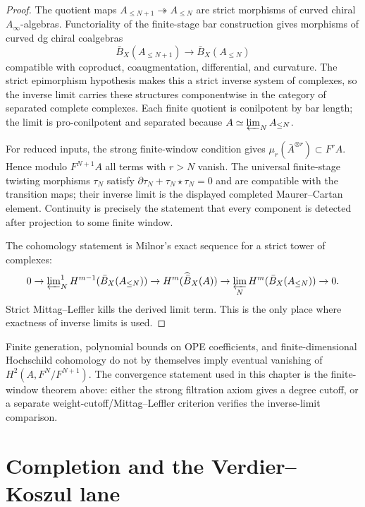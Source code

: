 \begin{proof}
The quotient maps $A_{\le N+1}\twoheadrightarrow A_{\le N}$ are
strict morphisms of curved chiral $A_\infty$-algebras.  Functoriality
of the finite-stage bar construction gives morphisms of curved dg
chiral coalgebras
\[
\bar B_X(A_{\le N+1})\longrightarrow\bar B_X(A_{\le N})
\]
compatible with coproduct, coaugmentation, differential, and curvature.
The strict epimorphism hypothesis makes this a strict inverse system
of complexes, so the inverse limit carries these structures
componentwise in the category of separated complete complexes.
Each finite quotient is conilpotent by bar length; the limit is
pro-conilpotent and separated because $A\simeq\varprojlim_N A_{\le N}$.

For reduced inputs, the strong finite-window condition gives
$\mu_r(\bar A^{\otimes r})\subset F^rA$.  Hence modulo $F^{N+1}A$ all
terms with $r>N$ vanish.  The universal finite-stage twisting
morphisms $\tau_N$ satisfy
$\partial\tau_N+\tau_N\star\tau_N=0$ and are compatible with the
transition maps; their inverse limit is the displayed completed
Maurer--Cartan element.  Continuity is precisely the statement that
every component is detected after projection to some finite window.

The cohomology statement is Milnor's exact sequence for a strict tower
of complexes:
\[
0\to
\varprojlim\nolimits_N^1 H^{m-1}(\bar B_X(A_{\le N}))
\to
H^m(\widehat{\bar B}_X(A))
\to
\varprojlim_N H^m(\bar B_X(A_{\le N}))
\to0 .
\]
Strict Mittag--Leffler kills the derived limit term.  This is the only
place where exactness of inverse limits is used.
\end{proof}

\begin{remark}\label{rem:completion-convergence-window}
Finite generation, polynomial bounds on OPE coefficients, and
finite-dimensional Hochschild cohomology do not by themselves imply
eventual vanishing of
$H^2(A,F^N/F^{N+1})$.  The convergence statement used in this chapter
is the finite-window theorem above: either the strong filtration axiom
gives a degree cutoff, or a separate weight-cutoff/Mittag--Leffler
criterion verifies the inverse-limit comparison.
\end{remark}

\section{Completion and the Verdier--Koszul lane}

